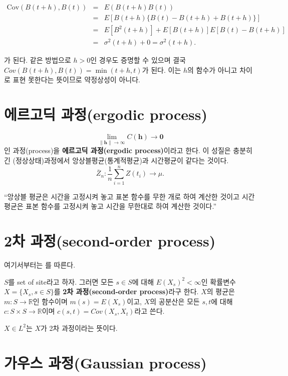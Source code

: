 \documentclass[b5paper,]{scrbook}
\theoremstyle{plain}
\theoremstyle{definition}
\numberwithin{equation}{section}
\let\BeginKnitrBlock\begin \let\EndKnitrBlock\end
\begin{document}
\begin{eqnarray}
\text{Cov}(B(t+h),B(t)) &=& E(B(t+h)B(t))\nonumber\\
&=&E[B(t+h)\{B(t)-B(t+h)+B(t+h)\}]\nonumber\\
&=&E[B^{2}(t+h)]+E[B(t+h)]E[B(t)-B(t+h)]\nonumber\\
&=&\sigma^{2}(t+h)+0=\sigma^{2}(t+h).
\end{eqnarray}

가 된다. 같은 방법으로 \(h > 0\)인 경우도 증명할 수 있으며 결국 \(Cov(B(t+h),B(t))=\min (t+h,t)\)가 된다. 이는 \(h\)의 함수가 아니고 차이로 표현 못한다는 뜻이므로 약정상성이 아니다.

\hypertarget{-ergodic-process}{%
\section{에르고딕 과정(ergodic process)}\label{-ergodic-process}}

\[\lim_{\|\mathbf{h}\| \rightarrow \infty}C(\mathbf{h}) \rightarrow \mathbf{0}\]
인 과정(process)을 \textbf{에르고딕 과정(ergodic process)}이라고 한다. 이 성질은 충분히 긴 (정상상태)과정에서 앙상블평균(통계적평균)과 시간평균이 같다는 것이다.
\[\bar{Z}_{n}:\frac{1}{n}\sum_{i=1}^{n}Z(t_{i}) \rightarrow \mu .\]

``앙상블 평균은 시간을 고정시켜 놓고 표본 함수를 무한 개로 하여 계산한 것이고 시간평균은 표본 함수를 고정시켜 놓고 시간을 무한대로 하여 계산한 것이다.''

\hypertarget{-second-order-process}{%
\section{2차 과정(second-order process)}\label{-second-order-process}}

여기서부터는 \citep{Gaetan2009}를 따른다.

\BeginKnitrBlock{definition}[2차 과정]
\protect\hypertarget{def:unnamed-chunk-360}{}{\label{def:unnamed-chunk-360} {} }\(S\)를 set of site라고 하자. 그러면 모든 \(s\in S\)에 대해 \(E(X_{s})^{2}<\infty\)인 확률변수 \(X=\{X_{s}, s\in S\}\)를 \textbf{2차 과정(second-order process)}라구 한다. \(X\)의 평균은 \(m:S\rightarrow \mathbb{R}\)인 함수이며 \(m(s)=E(X_{s})\)이고, \(X\)의 공분산은 모든 \(s,t\)에 대해 \(c: S\times S \rightarrow \mathbb{R}\)이며 \(c(s,t)=Cov(X_{s},X_{t})\)라고 쓴다.
\EndKnitrBlock{definition}

\(X\in L^{2}\)는 \(X\)가 2차 과정이라는 뜻이다.

\hypertarget{-gaussian-process}{%
\section{가우스 과정(Gaussian process)}\label{-gaussian-process}}
\end{document}
